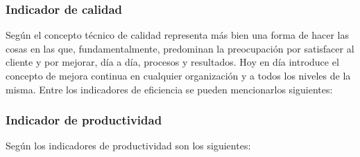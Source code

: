 
\subsubsection{Indicador de calidad}
Seg\'un \cite{cruz} el concepto t\'ecnico de calidad representa m\'as bien una forma
de hacer las cosas en las que, fundamentalmente, predominan la preocupaci\'on por
satisfacer al cliente y por mejorar, d\'ia a d\'ia, procesos y resultados. Hoy en d\'ia
introduce el concepto de mejora continua en cualquier organizaci\'on y a todos los
niveles de la misma. Entre los indicadores de eficiencia se pueden mencionarlos
siguientes:




\subsubsection{Indicador de productividad}
Seg\'un \cite{cruz} los indicadores de productividad son los siguientes:




